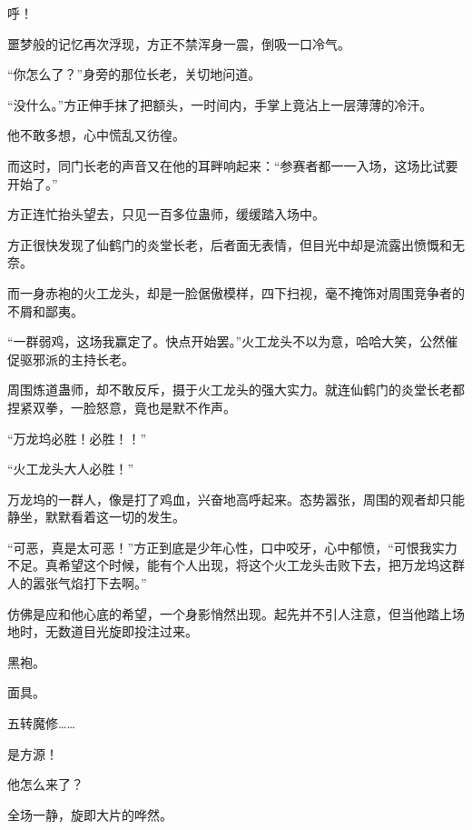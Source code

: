 \begin{this_body}
呼！

噩梦般的记忆再次浮现，方正不禁浑身一震，倒吸一口冷气。

“你怎么了？”身旁的那位长老，关切地问道。

“没什么。”方正伸手抹了把额头，一时间内，手掌上竟沾上一层薄薄的冷汗。

他不敢多想，心中慌乱又彷徨。

而这时，同门长老的声音又在他的耳畔响起来：“参赛者都一一入场，这场比试要开始了。”

方正连忙抬头望去，只见一百多位蛊师，缓缓踏入场中。

方正很快发现了仙鹤门的炎堂长老，后者面无表情，但目光中却是流露出愤慨和无奈。

而一身赤袍的火工龙头，却是一脸倨傲模样，四下扫视，毫不掩饰对周围竞争者的不屑和鄙夷。

“一群弱鸡，这场我赢定了。快点开始罢。”火工龙头不以为意，哈哈大笑，公然催促驱邪派的主持长老。

周围炼道蛊师，却不敢反斥，摄于火工龙头的强大实力。就连仙鹤门的炎堂长老都捏紧双拳，一脸怒意，竟也是默不作声。

“万龙坞必胜！必胜！！”

“火工龙头大人必胜！”

万龙坞的一群人，像是打了鸡血，兴奋地高呼起来。态势嚣张，周围的观者却只能静坐，默默看着这一切的发生。

“可恶，真是太可恶！”方正到底是少年心性，口中咬牙，心中郁愤，“可恨我实力不足。真希望这个时候，能有个人出现，将这个火工龙头击败下去，把万龙坞这群人的嚣张气焰打下去啊。”

仿佛是应和他心底的希望，一个身影悄然出现。起先并不引人注意，但当他踏上场地时，无数道目光旋即投注过来。

黑袍。

面具。

五转魔修……

是方源！

他怎么来了？

全场一静，旋即大片的哗然。

\end{this_body}

